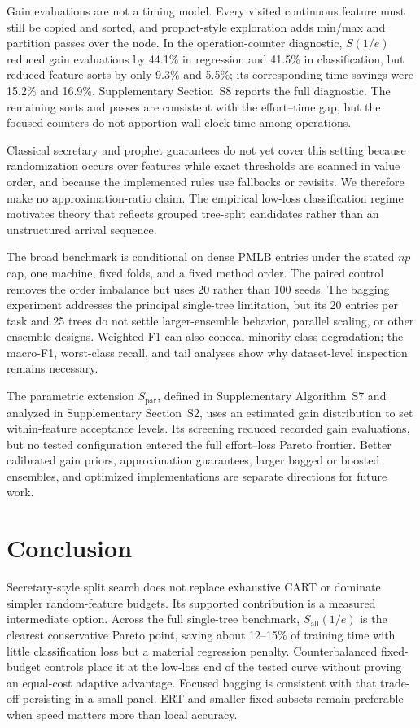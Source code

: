 \documentclass[final,5p,times,twocolumn]{elsarticle}
\begin{document}
Gain evaluations are not a timing model. Every visited continuous feature must still be copied and sorted, and prophet-style exploration adds min/max and partition passes over the node. In the operation-counter diagnostic, \(S(1/e)\) reduced gain evaluations by 44.1\% in regression and 41.5\% in classification, but reduced feature sorts by only 9.3\% and 5.5\%; its corresponding time savings were 15.2\% and 16.9\%. Supplementary Section~S8 reports the full diagnostic. The remaining sorts and passes are consistent with the effort--time gap, but the focused counters do not apportion wall-clock time among operations.

Classical secretary and prophet guarantees do not yet cover this setting because randomization occurs over features while exact thresholds are scanned in value order, and because the implemented rules use fallbacks or revisits. We therefore make no approximation-ratio claim. The empirical low-loss classification regime motivates theory that reflects grouped tree-split candidates rather than an unstructured arrival sequence.

The broad benchmark is conditional on dense PMLB entries under the stated \(np\) cap, one machine, fixed folds, and a fixed method order. The paired control removes the order imbalance but uses 20 rather than 100 seeds. The bagging experiment addresses the principal single-tree limitation, but its 20 entries per task and 25 trees do not settle larger-ensemble behavior, parallel scaling, or other ensemble designs. Weighted F1 can also conceal minority-class degradation; the macro-F1, worst-class recall, and tail analyses show why dataset-level inspection remains necessary.

The parametric extension \(S_{\mathrm{par}}\), defined in Supplementary Algorithm~S7 and analyzed in Supplementary Section~S2, uses an estimated gain distribution to set within-feature acceptance levels. Its screening reduced recorded gain evaluations, but no tested configuration entered the full effort--loss Pareto frontier. Better calibrated gain priors, approximation guarantees, larger bagged or boosted ensembles, and optimized implementations are separate directions for future work.

\section{Conclusion}
\label{sec:conclusion}

Secretary-style split search does not replace exhaustive CART or dominate simpler random-feature budgets. Its supported contribution is a measured intermediate option. Across the full single-tree benchmark, \(S_{\mathrm{all}}(1/e)\) is the clearest conservative Pareto point, saving about 12--15\% of training time with little classification loss but a material regression penalty. Counterbalanced fixed-budget controls place it at the low-loss end of the tested curve without proving an equal-cost adaptive advantage. Focused bagging is consistent with that trade-off persisting in a small panel. ERT and smaller fixed subsets remain preferable when speed matters more than local accuracy.
\end{document}
